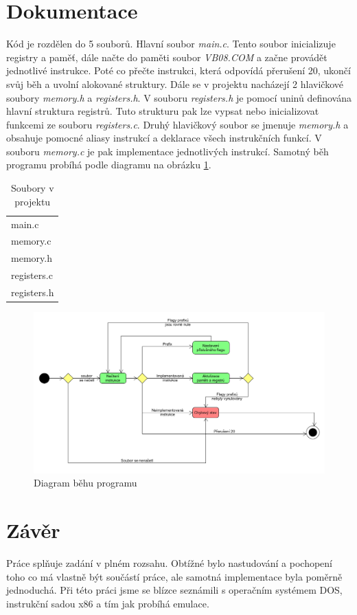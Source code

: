 \documentclass[a4paper, 12pt]{article}
\begin{document}
\section{Dokumentace}
Kód je rozdělen do 5 souborů. Hlavní soubor \textit{main.c}. Tento soubor inicializuje registry a paměť, dále načte do paměti soubor \textit{VB08.COM} a začne provádět jednotlivé instrukce. Poté co přečte instrukci, která odpovídá přerušení 20, ukončí svůj běh a uvolní alokované struktury. Dále se v projektu nacházejí 2 hlavičkové soubory \textit{memory.h} a \textit{registers.h}. V souboru \textit{registers.h} je pomocí uninů definována hlavní struktura registrů. Tuto strukturu pak lze vypsat nebo inicializovat funkcemi ze souboru \textit{registers.c}. Druhý hlavičkový soubor se jmenuje \textit{memory.h} a obsahuje pomocné aliasy instrukcí a deklarace všech instrukčních funkcí. V souboru \textit{memory.c} je pak implementace jednotlivých instrukcí. Samotný běh programu probíhá podle diagramu na obrázku \ref{uml}.
\begin{table}[h!]
\centering
\caption{Soubory v projektu}
\label{tab2}
\begin{tabular}{|l|}
\hline
main.c\\
memory.c \\
memory.h \\
registers.c \\
registers.h \\\hline
\end{tabular}
\end{table}
\begin{figure}[H]
    \centering
	\includegraphics[width=\textwidth]{img/uml.png}\par
    \caption{Diagram běhu programu}
  	\label{uml}
\end{figure}
\section{Závěr}
Práce splňuje zadání v plném rozsahu. Obtížné bylo nastudování a pochopení toho co má vlastně být součástí práce, ale samotná implementace byla poměrně jednoduchá. Při této práci jsme se blízce seznámili s operačním systémem DOS, instrukční sadou x86 a tím jak probíhá emulace.
\end{document}
